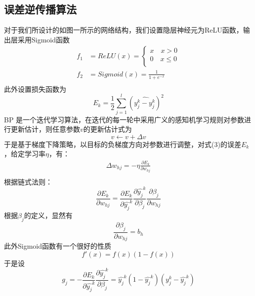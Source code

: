 \documentclass{progartcn}
\begin{document}
\subsection{误差逆传播算法}
对于我们所设计的如图一所示的网络结构，我们设置隐层神经元为ReLU函数，输出层采用Sigmoid函数
\begin{equation}
	\begin{aligned}
		f_1&=ReLU(x)=\left\{\begin{aligned}
			x \quad x>0 \\
			0 \quad x\leq 0 \\
		\end{aligned}\right. \\
		f_2&=Sigmoid(x)=\frac{1}{1+e^{-x}}\\
	\end{aligned}
\end{equation}
此外设置损失函数为
\begin{equation}
	E_k=\frac{1}{2} \sum_{j=1}^{l}(\hat{y_j^k-y_j^k})^2
\end{equation}
BP 是一个迭代学习算法，在迭代的每一轮中采用广义的感知机学习规则对参数进行更新估计，则任意参数$v$的更新估计式为
\begin{equation}
	v \leftarrow v+\Delta v
\end{equation}
于是基于梯度下降策略，以目标的负梯度方向对参数进行调整，对式(3)的误差$E_k$，给定学习率$\eta$，有：
\begin{equation}
	\begin{aligned}
		\Delta w_{hj}=-\eta \frac{\partial E_k}{\partial w_{hj}} \\
	\end{aligned}
\end{equation}
根据链式法则：
\begin{equation}
	\frac{\partial E_k}{\partial w_{hj}}=\frac{\partial E_k}{\partial \hat{y_j}^k}\frac{\partial \hat{y_j}^k}{\partial \beta_j}\frac{\partial \beta_j}{\partial w_{hj}}
\end{equation}
根据$\beta_j$的定义，显然有
\begin{equation}
	\frac{\partial \beta_j}{\partial w_{hj}}=b_h
\end{equation}
此外Sigmoid函数有一个很好的性质
\begin{equation}
	f'(x)=f(x)(1-f(x))
\end{equation}
于是设
\begin{equation}
	g_j=-\frac{\partial E_k}{\partial \hat{y_j}^k}\frac{\partial \hat{y_j}^k}{\partial \beta_j}=\hat{y_j}^k(1-\hat{y_j}^k)(y_j^k-\hat{y_j}^k)
\end{equation}
\end{document}
